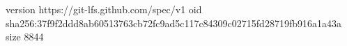 version https://git-lfs.github.com/spec/v1
oid sha256:37f9f2ddd8ab60513763cb72fc9ad5c117c84309c02715fd28719fb916a1a43a
size 8844
